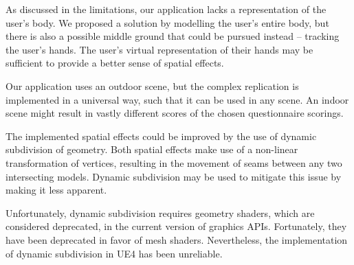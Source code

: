 As discussed in the limitations, our application lacks a representation of the user's body. We proposed a solution by modelling the user's entire body, but there is also a possible middle ground that could be pursued instead -- tracking the user's hands. The user's virtual representation of their hands may be sufficient to provide a better sense of spatial effects.

Our application uses an outdoor scene, but the complex replication is implemented in a universal way, such that it can be used in any scene. An indoor scene might result in vastly different scores of the chosen questionnaire scorings.

The implemented spatial effects could be improved by the use of dynamic subdivision of geometry. Both spatial effects make use of a non-linear transformation of vertices, resulting in the movement of seams between any two intersecting models. Dynamic subdivision may be used to mitigate this issue by making it less apparent.

Unfortunately, dynamic subdivision requires geometry shaders, which are considered deprecated, in the current version of graphics \acp{API}. Fortunately, they have been deprecated in favor of mesh shaders. Nevertheless, the implementation of dynamic subdivision in \ac{UE4} has been unreliable.
